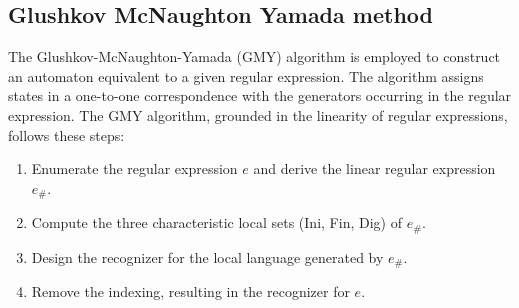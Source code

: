 \subsection{Glushkov McNaughton Yamada method}
The Glushkov-McNaughton-Yamada (GMY) algorithm is employed to construct an automaton equivalent to a given regular expression. 
The algorithm assigns states in a one-to-one correspondence with the generators occurring in the regular expression.
The GMY algorithm, grounded in the linearity of regular expressions, follows these steps:
\begin{enumerate}
    \item Enumerate the regular expression $e$ and derive the linear regular expression $e_{\#}$.
    \item Compute the three characteristic local sets (Ini, Fin, Dig) of $e_{\#}$.
    \item Design the recognizer for the local language generated by $e_{\#}$.
    \item Remove the indexing, resulting in the recognizer for $e$.
\end{enumerate}
